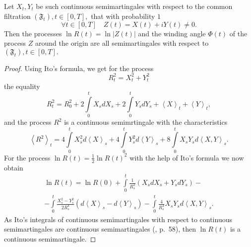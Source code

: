\documentclass[12pt, a4paper, titlepage]{article}
\begin{document}
\begin{lem}\label{AngleIsSemimartingaleLem}
Let $X_t, Y_t$ be such continuous semimartingales with respect to the common
filtration $(\mathfrak{F}_t), t\in[0,T],$
that with probability $1$ 
$$\forall t\in [0,T] \quad Z(t)=X(t)+iY(t) \ne 0.$$
Then the processes $\ln{R(t)}=\ln{|Z(t)|}$ and the winding angle $\Phi(t)$ of the process
$Z$ around the origin are all semimartingales with respect to $(\mathfrak{F}_t), t\in[0,T].$
\end{lem}
\begin{proof}
 Using Ito's formula, we get for the process 
$$R_t^2=X_t^2+Y_t^2$$
the equality
$$R_t^2=R_0^2+2\int\limits_0^t X_sdX_s+2\int\limits_0^t Y_sdY_s + \left<X\right>_t+\left<Y\right>_t,$$
and the process $R^2$ is a continuous semimrtingale with the characteristics
$$\left<R^2\right>_t=4\int\limits_0^t X_s^2 d\left<X\right>_s+4\int\limits_0^t Y_s^2 d\left<Y\right>_s +
8\int\limits_0^t X_s Y_s d\left<X,Y\right>_s.$$
 For the process $\ln{R(t)}=\frac12\ln{R(t)^2}$ with the help of Ito's formula we now obtain
\begin{multline*}
 \ln{R(t)}=\ln{R(0)}+\int\limits_0^t \frac{1}{R_s^2}(X_s dX_s + Y_s dY_s)-\\-
\int\limits_0^t \frac{X_s^2-Y_s^2}{2 R_s^4}(d\left<X\right>_s-d\left<Y\right>_s)-
\int\limits_0^t \frac{4}{R_s^4}X_s Y_s d\left<X, Y\right>_s.
\end{multline*}
As Ito's integrals of continuous semimartingales with respect to continuous semimartingales
are continuous semimartingales (\cite{Kunita}, p.~58), then 
$\ln{R(t)}$ is a continuous semimartingale. 


\end{proof}
\end{document}
